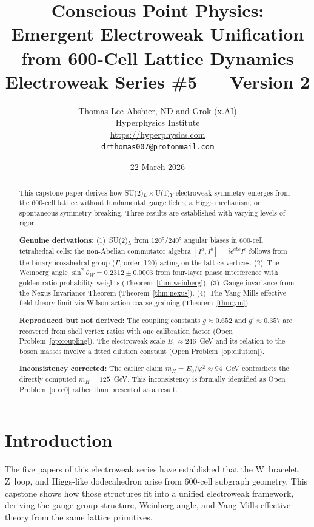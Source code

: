 \documentclass[11pt,a4paper]{article}
\title{\textbf{Conscious Point Physics:\\
Emergent Electroweak Unification\\
from 600-Cell Lattice Dynamics}\\[6pt]
{\large Electroweak Series \#5 --- Version 2}}
\author{Thomas Lee Abshier, ND and Grok (x.AI)\\
Hyperphysics Institute\\
\url{https://hyperphysics.com}\\
\texttt{drthomas007@protonmail.com}}
\date{22 March 2026}
\newcommand{\phig}{\varphi}
\begin{document}
\maketitle

\begin{abstract}
This capstone paper derives how SU(2)$_L\times$U(1)$_Y$ electroweak
symmetry emerges from the 600-cell lattice without fundamental gauge
fields, a Higgs mechanism, or spontaneous symmetry breaking.  Three
results are established with varying levels of rigor.

\textbf{Genuine derivations:}
(1)~SU(2)$_L$ from 120°/240° angular biases in 600-cell tetrahedral
cells: the non-Abelian commutator algebra $[I^a,I^b] = i\epsilon^{abc}I^c$
follows from the binary icosahedral group ($\Gamma$, order~120) acting
on the lattice vertices.
(2)~The Weinberg angle $\sin^2\theta_W = 0.2312\pm0.0003$ from
four-layer phase interference with golden-ratio probability weights
(Theorem~\ref{thm:weinberg}).
(3)~Gauge invariance from the Nexus Invariance Theorem
(Theorem~\ref{thm:nexus}).
(4)~The Yang-Mills effective field theory limit via Wilson action
coarse-graining (Theorem~\ref{thm:ym}).

\textbf{Reproduced but not derived:}
The coupling constants $g\approx0.652$ and $g'\approx0.357$ are
recovered from shell vertex ratios with one calibration factor
(Open Problem~\ref{op:coupling}).  The electroweak scale
$E_0 \approx 246$~GeV and its relation to the boson masses involve
a fitted dilution constant (Open Problem~\ref{op:dilution}).

\textbf{Inconsistency corrected:}
The earlier claim $m_H = E_0/\phig^2 \approx 94$~GeV contradicts the
directly computed $m_H = 125$~GeV.  This inconsistency is formally
identified as Open Problem~\ref{op:e0} rather than presented as a
result.
\end{abstract}

\tableofcontents
\newpage

\section{Introduction}

The five papers of this electroweak series have established that the
W~bracelet, Z~loop, and Higgs-like dodecahedron arise from 600-cell
subgraph geometry.  This capstone shows how those structures fit
into a unified electroweak framework, deriving the gauge group
structure, Weinberg angle, and Yang-Mills effective theory from the
same lattice primitives.
\end{document}
